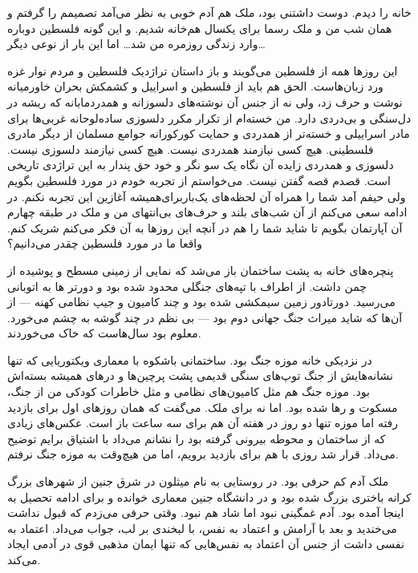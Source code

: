 \documentclass[letterpaper,12pt]{article}
\begin{document}
خانه را دیدم. دوست داشتنی بود، ملک هم آدم خوبی به نظر می‌آمد تصمیمم را گرفتم و همان شب من و ملک رسما برای یکسال هم‌خانه شدیم. و این گونه فلسطین دوباره وارد زندگی روزمره من شد… اما این بار از نوعی دیگر…

این روزها همه از فلسطین می‌گویند و باز داستان تراژدیک فلسطین و مردم نوار غزه ورد زبان‌هاست. الحق هم باید از فلسطین و اسراییل و کشمکش بحران خاورمیانه نوشت و حرف زد، ولی نه از جنس آن نوشته‌های دلسوزانه و همدردمابانه که ریشه در دل‌سنگی و بی‌دردی دارد. من خسته‌ام از تکرار مکرر دلسوزی ساده‌لوحانه غربی‌ها برای مادر اسراییلی و خسته‌تر از همدردی و حمایت کورکورانه جوامع مسلمان از دیگر مادری فلسطینی. هیچ کسی نیازمند همدردی نیست. هیچ کسی نیازمند دلسوزی نیست. دلسوزی و همدردی زایده آن نگاه یک سو نگر و خود حق پندار به این تراژدی تاریخی است.
قصدم قصه گفتن نیست. می‌خواستم از تجربه خودم در مورد فلسطین بگویم ولی حیفم آمد شما را همراه آن لحظه‌های یک‌باربرای‌همیشه آغازین این تجربه نکنم. در ادامه سعی می‌کنم از آن شب‌های بلند و حرف‌های بی‌انتهای من و ملک در طبقه چهارم آن آپارتمان بگویم تا شاید شما را هم در آنچه این روزها به آن فکر می‌کنم شریک کنم. واقعا ما در مورد فلسطین چقدر می‌دانیم؟

پنچره‌های خانه به پشت ساختمان باز می‌شد که نمایی از زمینی مسطح و پوشیده از چمن داشت. از اطراف با تپه‌های جنگلی محدود شده بود و دورتر ها به اتوبانی می‌رسید. دورتادور زمین سیمکشی شده بود و چند کامیون و جیپ نظامی‌ کهنه — از آن‌ها که شاید میراث جنگ جهانی دوم بود — بی نظم در چند گوشه به چشم می‌خورد. معلوم بود سال‌هاست که خاک می‌خوردند.

در نزدیکی خانه موزه جنگ بود. ساختمانی باشکوه با معماری ویکتوریایی که تنها نشانه‌هایش از جنگ توپ‌های سنگی قدیمی پشت پرچین‌ها و در‌های همیشه بسته‌اش بود. موزه جنگ هم مثل کامیون‌های نظامی و مثل خاطرات کودکی من از جنگ، مسکوت و رها شده بود. اما نه برای ملک. می‌گفت که همان روزهای اول برای بازدید رفته اما موزه تنها دو روز در هفته آن هم برای سه ساعت باز است. عکس‌های زیادی که از ساختمان و محوطه بیرونی گرفته بود را نشانم می‌داد با اشتیاق برایم توضیح می‌داد. قرار شد روزی با هم برای بازدید برویم، اما من هیچ‌وقت به موزه جنگ نرفتم.

ملک آدم کم حرفی بود. در روستایی به نام میثلون در شرق جنین از شهرهای بزرگ کرانه باختری بزرگ شده بود و در دانشگاه جنین معماری خوانده و برای ادامه تحصیل به اینجا آمده بود. آدم غمگینی نبود اما شاد هم نبود. وقتی حرفی می‌زدم که قبول نداشت می‌خندید و بعد با آرامش و اعتماد به نفس، با لبخندی بر لب، جواب می‌داد. اعتماد به نفسی داشت از جنس آن اعتماد به نفس‌هایی که تنها ایمان مذهبی قوی در آدمی ایجاد می‌کند.
\end{document}
